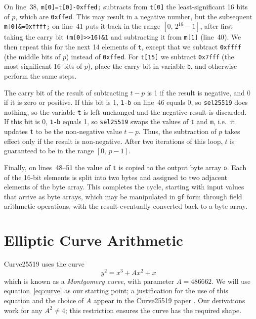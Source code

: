 \documentclass{article}
\begin{document}
On line~38, \verb|m[0]=t[0]-0xffed;| subtracts from \verb|t[0]| the least-significant 16 bits of $p$, which are \verb|0xffed|.
This may result in a negative number, but the subsequent \verb|m[0]&=0xffff;| on line~41 puts it back in the range $[0,\, 2^{16}-1]$, after first taking the carry bit \verb|(m[0]>>16)&1| and subtracting it from \verb|m[1]| (line~40).
We then repeat this for the next 14 elements of \verb|t|, except that we subtract \verb|0xffff| (the middle bits of $p$) instead of \verb|0xffed|.
For \verb|t[15]| we subtract \verb|0x7fff| (the most-significant 16 bits of $p$), place the carry bit in variable \verb|b|, and otherwise perform the same steps.

The carry bit of the result of subtracting $t-p$ is 1 if the result is negative, and 0 if it is zero or positive.
If this bit is 1, \verb|1-b| on line~46 equals 0, so \verb|sel25519| does nothing, so the variable \verb|t| is left unchanged and the negative result is discarded.
If this bit is 0, \verb|1-b| equals 1, so \verb|sel25519| swaps the values of \verb|t| and \verb|m|, i.e.\ it updates \verb|t| to be the non-negative value $t-p$.
Thus, the subtraction of $p$ takes effect only if the result is non-negative.
After two iterations of this loop, $t$ is guaranteed to be in the range $[0,\, p-1]$.

Finally, on lines~48--51 the value of \verb|t| is copied to the output byte array \verb|o|.
Each of the 16-bit elements is split into two bytes and assigned to two adjacent elements of the byte array.
This completes the cycle, starting with input values that arrive as byte arrays, which may be manipulated in \verb|gf| form through field arithmetic operations, with the result eventually converted back to a byte array.

\section{Elliptic Curve Arithmetic}\label{sec:curve-arithmetic}

Curve25519 uses the curve
\begin{equation}\label{eq:curve}
y^2 = x^3 + A x^2 + x
\end{equation}
which is known as a \emph{Montgomery curve}, with parameter $A = 486662$.
We will use equation~\eqref{eq:curve} as our starting point; a justification for the use of this equation and the choice of $A$ appear in the Curve25519 paper \cite{Bernstein:2006kw}.
Our derivations work for any $A^2 \ne 4$; this restriction ensures the curve has the required shape.
\end{document}
